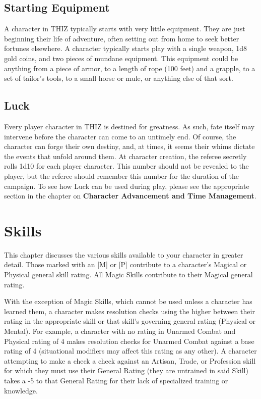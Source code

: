 \documentclass[oneside]{book}
\begin{document}
\onecolumn
\section{Starting Equipment}
A character in THIZ typically starts with very little equipment. They are just beginning their life of adventure, often setting out from home to seek better fortunes elsewhere. A character typically starts play with a single weapon, 1d8 gold coins, and two pieces of mundane equipment. This equipment could be anything from a piece of armor, to a length of rope (100 feet) and a grapple, to a set of tailor's tools, to a small horse or mule, or anything else of that sort. 

\section{Luck}
Every player character in THIZ is destined for greatness. As such, fate itself may intervene before the character can come to an untimely end. Of course, the character can forge their own destiny, and, at times, it seems their whims dictate the events that unfold around them.  At character creation, the referee secretly rolls 1d10 for each player character. This number should not be revealed to the player, but the referee should remember this number for the duration of the campaign. To see how Luck can be used during play, please see the appropriate section in the chapter on \textbf{Character Advancement and Time Management}.

\chapter{Skills}
This chapter discusses the various skills available to your character in greater detail. Those marked with an [M] or [P] contribute to a character's Magical or Physical general skill rating. All Magic Skills contribute to their Magical general rating.

With the exception of Magic Skills, which cannot be used unless a character has learned them, a character makes resolution checks using the higher between their rating in the appropriate skill or that skill's governing general rating (Physical or Mental). For example, a character with no rating in Unarmed Combat and Physical rating of 4 makes resolution checks for Unarmed Combat against a base rating of 4 (situational modifiers may affect this rating as any other). A character attempting to make a check a check against an Artisan, Trade, or Profession skill for which they must use their General Rating (they are untrained in said Skill) takes a -5 to that General Rating for their lack of specialized training or knowledge.
\end{document}

